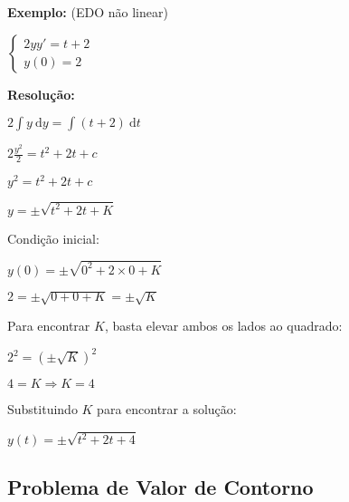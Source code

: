 \documentclass[a4paper]{article}
\newcommand{\ud}{\mathrm{\ d}}
\begin{document}
\hrulefill

\begin{multicols}{2}
{\bf Exemplo:} (EDO não linear)

$
\left\{
  \begin{array}{l}
    2yy'=t+2\\
    y(0)=2
  \end{array}
\right.
$

\bigskip
{\bf Resolução:}

$2\int y \ud y = \int (t+2) \ud t$

$2\frac{y^2}{2} = t^2 + 2t + c$

$y^2 = t^2 + 2t + c$

$y = \pm \sqrt{t^2 + 2t +K}$

Condição inicial:

$y(0)=\pm \sqrt{0^2 + 2\times 0 +K}$

$2 = \pm \sqrt{0 + 0 +K} = \pm \sqrt{K}$

Para encontrar $K$, basta elevar ambos os lados ao quadrado:

$2^2 = \left( \pm \sqrt{K} \right)^2$

$4 = K \Rightarrow K=4$

Substituindo $K$ para encontrar a solução:

$y(t) = \pm \sqrt{t^2 + 2t +4}$
\end{multicols}

\hrulefill

\subsection{Problema de Valor de Contorno}
\end{document}
